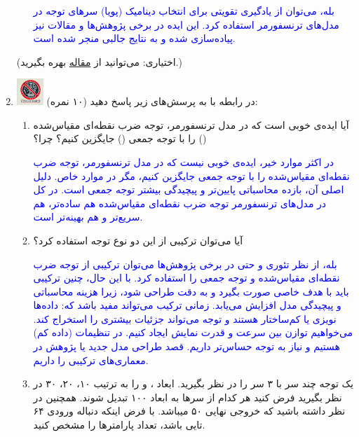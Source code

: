 \documentclass[12pt]{article}
\begin{document}
\begin{enumerate}
\begin{enumerate}
            \textcolor{blue}{
            بله، می‌توان از یادگیری تقویتی برای انتخاب دینامیک (پویا) سرهای توجه در مدل‌های ترنسفورمر استفاده کرد. این ایده در برخی پژوهش‌ها و مقالات نیز پیاده‌سازی شده و به نتایج جالبی منجر شده است.
            }
        \end{enumerate}
        (اختیاری: می‌توانید از \href{https://arxiv.org/abs/1905.10650}{مقاله}  بهره بگیرید.)
    \item \includegraphics[width=1cm]{figs/Forbidden_AI.jpg}
    در رابطه با  به پرسش‌های زیر پاسخ دهید (۱۰ نمره):
    \begin{enumerate}
        \item آیا ایده‌ی خوبی است که در مدل ترنسفورمر، توجه ضرب نقطه‌ای مقیاس‌شده () را با توجه جمعی () جایگزین کنیم؟ چرا؟

        \textcolor{blue}{
        در اکثر موارد خیر، ایده‌ی خوبی نیست که در مدل ترنسفورمر، توجه ضرب نقطه‌ای مقیاس‌شده را با توجه جمعی جایگزین کنیم، مگر در موارد خاص. دلیل اصلی آن، بازده محاسباتی پایین‌تر و پیچیدگی بیشتر توجه جمعی است. در کل در مدل‌های ترنسفورمر توجه ضرب نقطه‌ای مقیاس‌شده هم ساده‌تر، هم سریع‌تر و هم بهینه‌تر است.
        }
        \item آیا می‌توان ترکیبی از این دو نوع توجه استفاده کرد؟

        \textcolor{blue}{
        بله، از نظر تئوری و حتی در برخی پژوهش‌ها می‌توان ترکیبی از توجه ضرب نقطه‌ای مقیاس‌شده و توجه جمعی را استفاده کرد. با این حال، چنین ترکیبی باید با هدف خاصی صورت بگیرد و به دقت طراحی شود، زیرا هزینه محاسباتی و پیچیدگی مدل افزایش می‌یابد.
        زمانی ترکیب می‌تواند مفید باشد که:
        داده‌ها نویزی یا کم‌ساختار هستند و توجه  می‌تواند جزئیات بیشتری را استخراج کند.
        می‌خواهیم توازن بین سرعت و قدرت نمایش ایجاد کنیم.
        در تنظیمات  (داده کم) هستیم و نیاز به توجه حساس‌تر داریم.
        قصد طراحی مدل جدید یا پژوهش در معماری‌های ترکیبی را داریم.
        }
        \item یک توجه چند سر  با ۳ سر را در نظر بگیرید. ابعاد  ، و  را به ترتیب ۱۰، ۲۰، ۳۰ در نظر بگیرید فرض کنید هر کدام از سرها به ابعاد ۱۰۰ تبدیل شوند. همچنین در نظر داشته باشید که خروجی نهایی ۵۰ میباشد. با فرض اینکه دنباله ورودی ۶۴ تایی باشد، تعداد پارامترها را مشخص کنید.


\end{enumerate}
\end{enumerate}
\end{document}
